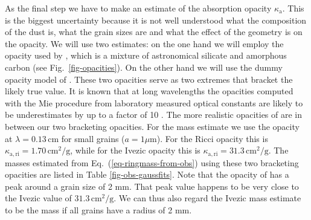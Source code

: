 \documentclass{aa}
\begin{document}
As the final step we have to make an estimate of the absorption opacity
$\kappa_{\mathrm{a}}$. This is the biggest uncertainty because it is not well
understood what the composition of the dust is, what the grain sizes are and
what the effect of the geometry is on the opacity. We will use two estimates: on
the one hand we will employ the opacity used by \citet{2010A&A...512A..15R},
which is a mixture of astronomical silicate and amorphous carbon (see
Fig.~\ref{fig-opacities}). On the other hand we will use the dummy opacity model
of \citet{1997MNRAS.291..121I}. These two opacities serve as two extremes that
bracket the likely true value. It is known that at long wavelengths the
opacities computed with the Mie procedure from laboratory measured optical
constants are likely to be underestimates by up to a factor of 10
\citep{2017A&A...600A.123D}. The more realistic opacities of
\citep{2017A&A...600A.123D} are in between our two bracketing opacities.  For
the mass estimate we use the opacity at $\lambda=0.13\,\mathrm{cm}$ for small
grains ($a=1\mu\mathrm{m}$). For the Ricci opacity this is
$\kappa_{\mathrm{a,ri}}=1.70\,\mathrm{cm}^2/\mathrm{g}$, while for the Ivezic
opacity this is $\kappa_{\mathrm{a,ri}}=31.3\,\mathrm{cm}^2/\mathrm{g}$. The
masses estimated from Eq.~(\ref{eq-ringmass-from-obs}) using these two
bracketing opacities are listed in Table \ref{fig-obs-gaussfits}. Note that the
opacity of \citet{2010A&A...512A..15R} has a peak around a grain size of 2
$\mathrm{mm}$. That peak value happens to be very close to the Ivezic value of
$31.3\,\mathrm{cm}^2/\mathrm{g}$. We can thus also regard the Ivezic mass
estimate to be the mass if all grains have a radius of 2 mm.
\end{document}
